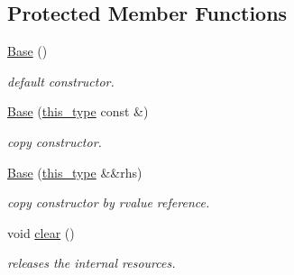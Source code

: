 \subsection*{Protected Member Functions}
\begin{DoxyCompactItemize}
\item 
\hypertarget{classhryky_1_1http_1_1header_1_1field_1_1_base_a5ffe0568374d8b9b4c4ec32953fd6453}{\hyperlink{classhryky_1_1http_1_1header_1_1field_1_1_base_a5ffe0568374d8b9b4c4ec32953fd6453}{Base} ()}\label{classhryky_1_1http_1_1header_1_1field_1_1_base_a5ffe0568374d8b9b4c4ec32953fd6453}

\begin{DoxyCompactList}\small\item\em default constructor. \end{DoxyCompactList}\item 
\hypertarget{classhryky_1_1http_1_1header_1_1field_1_1_base_a663fa22bf8197e0acf1adc4ff4f74cd8}{\hyperlink{classhryky_1_1http_1_1header_1_1field_1_1_base_a663fa22bf8197e0acf1adc4ff4f74cd8}{Base} (\hyperlink{classhryky_1_1http_1_1header_1_1field_1_1_base_ac62199121ede1697541768c2e79f5470}{this\-\_\-type} const \&)}\label{classhryky_1_1http_1_1header_1_1field_1_1_base_a663fa22bf8197e0acf1adc4ff4f74cd8}

\begin{DoxyCompactList}\small\item\em copy constructor. \end{DoxyCompactList}\item 
\hypertarget{classhryky_1_1http_1_1header_1_1field_1_1_base_a09ce91786e009adb52fcf031bdb249e6}{\hyperlink{classhryky_1_1http_1_1header_1_1field_1_1_base_a09ce91786e009adb52fcf031bdb249e6}{Base} (\hyperlink{classhryky_1_1http_1_1header_1_1field_1_1_base_ac62199121ede1697541768c2e79f5470}{this\-\_\-type} \&\&rhs)}\label{classhryky_1_1http_1_1header_1_1field_1_1_base_a09ce91786e009adb52fcf031bdb249e6}

\begin{DoxyCompactList}\small\item\em copy constructor by rvalue reference. \end{DoxyCompactList}\item 
\hypertarget{classhryky_1_1http_1_1header_1_1field_1_1_base_a135bce05655e290c78fa83196199a576}{void \hyperlink{classhryky_1_1http_1_1header_1_1field_1_1_base_a135bce05655e290c78fa83196199a576}{clear} ()}\label{classhryky_1_1http_1_1header_1_1field_1_1_base_a135bce05655e290c78fa83196199a576}

\begin{DoxyCompactList}\small\item\em releases the internal resources. \end{DoxyCompactList}\end{DoxyCompactItemize}
